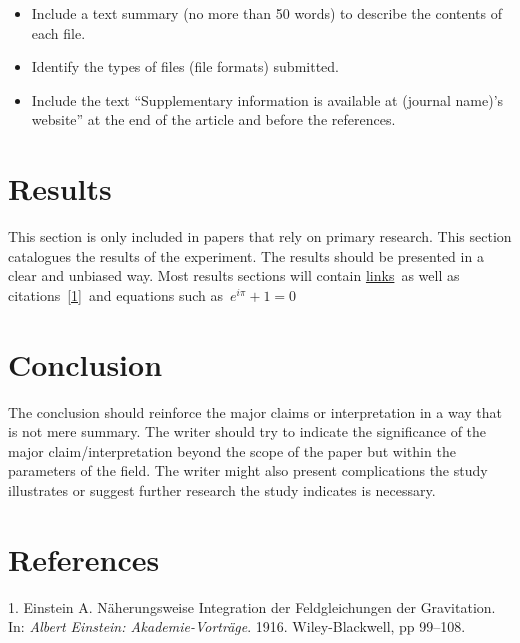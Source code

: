 \documentclass{article}
\providecommand{\tightlist}{\setlength{\itemsep}{0pt}\setlength{\parskip}{0pt}}%
\begin{document}
\begin{itemize}
\tightlist
\item
  Include a text summary (no more than 50 words) to describe the
  contents of each file.\\
\item
  Identify the types of files (file formats) submitted.\\
\item
  Include the text ``Supplementary information is available at (journal
  name)'s website'' at the end of the article and before the
  references.\\
\end{itemize}

\section*{Results}\label{results}

This section is only included in papers that rely on primary research.
This section catalogues the results of the experiment. The results
should be presented in a clear and unbiased way. Most results sections
will contain \href{http://authorea.com}{links}~as well as
citations~\hyperref[csl:1]{[1]}~and equations such as~\(e^{i\pi}+1=0\)\\

\section*{Conclusion}\label{auto-label-section-853974}

The conclusion should reinforce the major claims or interpretation in a
way that is not mere summary. The writer should try to indicate the
significance of the major claim/interpretation beyond the scope of the
paper but within the parameters of the field. The writer might also
present complications the study illustrates or suggest further research
the study indicates is necessary.

\FloatBarrier
\section*{References}\sloppy
{}
\label{csl:1}1. Einstein A. {Näherungsweise Integration der Feldgleichungen der Gravitation}. In: \textit{Albert Einstein: Akademie-Vorträge}. 1916. Wiley-Blackwell, pp 99–108. 
\end{document}
